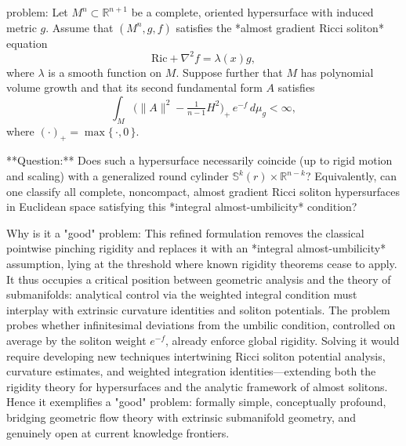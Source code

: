 problem:  
Let \( M^n \subset \mathbb{R}^{n+1} \) be a complete, oriented hypersurface with induced metric \( g \). Assume that \( (M^n,g,f) \) satisfies the *almost gradient Ricci soliton* equation  
\[
\mathrm{Ric} + \nabla^2 f = \lambda(x) g,
\]
where \( \lambda \) is a smooth function on \( M \). Suppose further that \( M \) has polynomial volume growth and that its second fundamental form \( A \) satisfies  
\[
\int_M \big(\|A\|^2 - \tfrac{1}{n-1} H^2\big)_+ \, e^{-f} \, d\mu_g < \infty,
\]
where \( (\cdot)_+ = \max\{\,\cdot,0\,\} \).  

**Question:**  
Does such a hypersurface necessarily coincide (up to rigid motion and scaling) with a generalized round cylinder \( \mathbb{S}^k(r) \times \mathbb{R}^{n-k} \)?  
Equivalently, can one classify all complete, noncompact, almost gradient Ricci soliton hypersurfaces in Euclidean space satisfying this *integral almost-umbilicity* condition?  

Why is it a "good" problem:  
This refined formulation removes the classical pointwise pinching rigidity and replaces it with an *integral almost-umbilicity* assumption, lying at the threshold where known rigidity theorems cease to apply. It thus occupies a critical position between geometric analysis and the theory of submanifolds: analytical control via the weighted integral condition must interplay with extrinsic curvature identities and soliton potentials. The problem probes whether infinitesimal deviations from the umbilic condition, controlled on average by the soliton weight \( e^{-f} \), already enforce global rigidity. Solving it would require developing new techniques intertwining Ricci soliton potential analysis, curvature estimates, and weighted integration identities—extending both the rigidity theory for hypersurfaces and the analytic framework of almost solitons. Hence it exemplifies a "good" problem: formally simple, conceptually profound, bridging geometric flow theory with extrinsic submanifold geometry, and genuinely open at current knowledge frontiers.